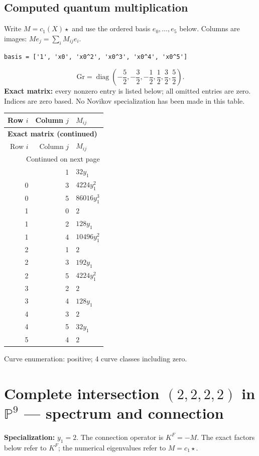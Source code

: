 \documentclass[10pt,a4paper]{article}
\begin{document}
\subsection*{Computed quantum multiplication}
Write $M=c_1(X)\star$ and use the ordered basis $e_0,\ldots,e_{5}$ below. Columns are images: $M e_j=\sum_i M_{ij}e_i$.
\begin{lstlisting}
basis = ['1', 'x0', 'x0^2', 'x0^3', 'x0^4', 'x0^5']
\end{lstlisting}
\[\mathrm{Gr}=\operatorname{diag}\!\left(- \frac{5}{2},- \frac{3}{2},- \frac{1}{2},\frac{1}{2},\frac{3}{2},\frac{5}{2}\right).\]
\textbf{Exact matrix:} every nonzero entry is listed below; all omitted entries are zero. Indices are zero based. No Novikov specialization has been made in this table.
{\small\setlength{\tabcolsep}{7pt}\begin{longtable}{rrp{125mm}}
\toprule Row $i$ & Column $j$ & $M_{ij}$\\\midrule\endfirsthead
\multicolumn{3}{l}{\textbf{Exact matrix (continued)}}\\
\toprule Row $i$ & Column $j$ & $M_{ij}$\\\midrule\endhead
\midrule\multicolumn{3}{r}{Continued on next page}\\\endfoot\bottomrule\endlastfoot
0 & 1 & $32 y_{1}$\\
0 & 3 & $4224 y_{1}^{2}$\\
0 & 5 & $86016 y_{1}^{3}$\\
1 & 0 & $2$\\
1 & 2 & $128 y_{1}$\\
1 & 4 & $10496 y_{1}^{2}$\\
2 & 1 & $2$\\
2 & 3 & $192 y_{1}$\\
2 & 5 & $4224 y_{1}^{2}$\\
3 & 2 & $2$\\
3 & 4 & $128 y_{1}$\\
4 & 3 & $2$\\
4 & 5 & $32 y_{1}$\\
5 & 4 & $2$\\
\end{longtable}}
Curve enumeration: positive; 4 curve classes including zero.
\clearpage\section*{Complete intersection $(2,2,2,2)$ in $\mathbb P^{9}$ --- spectrum and connection}
\textbf{Specialization:} $y_1=2$. The connection operator is $K^F=-M$. The exact factors below refer to $K^F$; the numerical eigenvalues refer to $M=c_1\star$.
\end{document}

